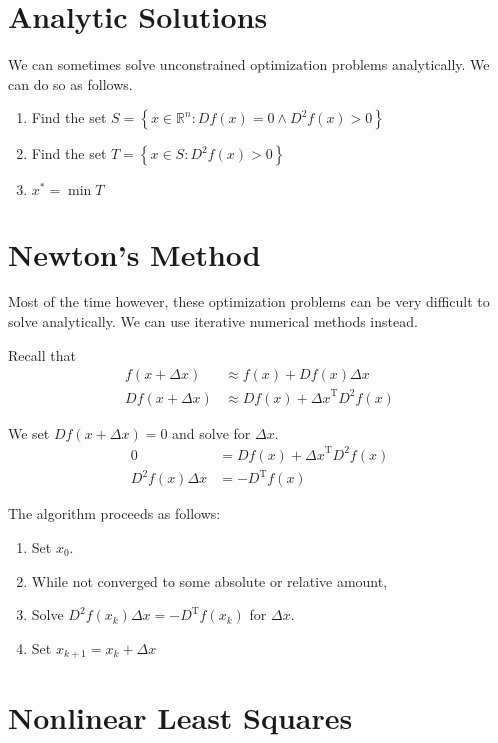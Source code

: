\documentclass{article}
\begin{document}
\section{Analytic Solutions}
We can sometimes solve unconstrained optimization problems analytically. We can do so as follows.

\begin{enumerate}
    \item Find the set $S = \left\{ x \in \mathbb{R}^n : Df(x) = 0 \land D^2 f(x) > 0\right\}$
    \item Find the set $T = \left\{ x \in S : D^2f(x) > 0 \right\}$
    \item $x^* = \min T$
\end{enumerate}

\section{Newton's Method}
Most of the time however, these optimization problems can be very difficult to solve analytically. We can use iterative numerical methods instead.

Recall that
\begin{align}
    f(x + \Delta x) &\approx f(x) + Df(x) \Delta x \\
    Df(x + \Delta x) &\approx Df(x) + {\Delta x}^\mathrm{T} D^2 f(x) 
\end{align}

We set $Df(x + \Delta x) = 0$ and solve for $\Delta x$.
\begin{align}
    0 &= Df(x) + {\Delta x}^\mathrm{T} D^2 f(x) \\
    D^2 f(x) \Delta x &= - D^\mathrm{T} f(x)
\end{align}

The algorithm proceeds as follows:
\begin{enumerate}
    \item Set $x_0$.
    \item While not converged to some absolute or relative amount,
    \item Solve $D^2 f(x_k) \Delta x = -D^\mathrm{T} f(x_k)$ for $\Delta x$.
    \item Set $x_{k+1} = x_k + \Delta x$
\end{enumerate}

\section{Nonlinear Least Squares}
\end{document}
